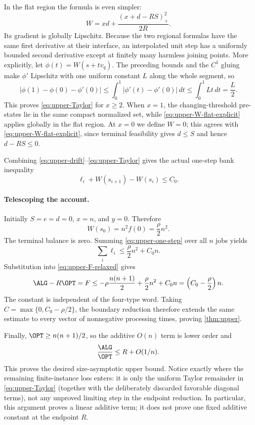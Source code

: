 In the flat region the formula is even simpler:
\begin{equation}
\label{eq:upper-W-flat-explicit}
 W=x d+\frac{(x+d-RS)_+^2}{2R}.
\end{equation}
Its gradient is globally Lipschitz.  Because the two regional formulas have
the same first derivative at their interface, an interpolated unit step has a
uniformly bounded second derivative except at finitely many harmless joining
points.  More explicitly, let $\phi(t)=W(s+t v_q)$.  The preceding bounds and
the $C^1$ gluing make $\phi'$ Lipschitz with one uniform constant $L$ along
the whole segment, so
\[
 \left|\phi(1)-\phi(0)-\phi'(0)\right|
 \le \int_0^1\left|\phi'(t)-\phi'(0)\right|\,dt
 \le \int_0^1 Lt\,dt=\frac L2.
\]
This proves \eqref{eq:upper-Taylor} for $x\ge2$.  When $x=1$, the
changing-threshold pre-states lie in the same compact normalized set, while
\eqref{eq:upper-W-flat-explicit} applies globally in the flat region.  At
$x=0$ we define $W=0$; this agrees with
\eqref{eq:upper-W-flat-explicit}, since terminal feasibility gives
$d\le S$ and hence $d-RS\le0$.

Combining \eqref{eq:upper-drift}--\eqref{eq:upper-Taylor} gives the actual
one-step bank inequality
\begin{equation}
\label{eq:upper-one-step}
 \ell_i+W(s_{i+1})-W(s_i)\le C_0.
\end{equation}

\paragraph{Telescoping the account.}
Initially $S=e=d=0$, $x=n$, and $y=0$.  Therefore
\begin{equation}
\label{eq:upper-W-initial}
 W(s_0)=n^2f(0)=\frac\rho2n^2.
\end{equation}
The terminal balance is zero.  Summing
\eqref{eq:upper-one-step} over all $n$ jobs yields
\[
 \sum_i\ell_i\le \frac\rho2n^2+C_0n.
\]
Substitution into \eqref{eq:upper-F-relaxed} gives
\[
 \ALG-R\OPT=F
 \le
 -\rho\frac{n(n+1)}2+\frac\rho2n^2+C_0n
 =\left(C_0-\frac\rho2\right)n.
\]
The constant is independent of the four-type word.  Taking
$C=\max\{0,C_0-\rho/2\}$, the boundary reduction therefore extends the same
estimate to every vector of nonnegative processing times, proving
\cref{thm:upper}.

Finally, $\OPT\ge n(n+1)/2$, so the additive $O(n)$ term is lower order and
\[
 \frac{\ALG}{\OPT}\le R+O(1/n).
\]
This proves the desired size-asymptotic upper bound.  Notice exactly where the
remaining finite-instance loss enters: it is only the uniform Taylor
remainder in \eqref{eq:upper-Taylor} (together with the deliberately
discarded favorable diagonal terms), not any unproved limiting step in the
endpoint reduction.  In particular, this argument proves a linear additive
term; it does not prove one fixed additive constant at the endpoint $R$.
